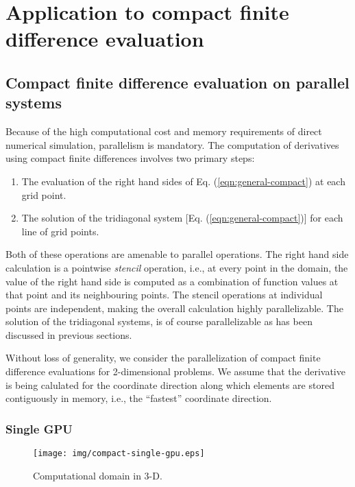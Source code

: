 \chapter{Application to compact finite difference evaluation}

\section{Compact finite difference evaluation on parallel systems}

Because of the high computational cost
and memory requirements of direct numerical simulation,
parallelism is mandatory.
The computation of derivatives using
compact finite differences involves two primary steps:

\begin{enumerate}
\item The evaluation of the right hand sides
    of Eq. (\ref{eqn:general-compact})
    at each grid point.
\item The solution of the tridiagonal system
    [Eq. (\ref{eqn:general-compact})]
    for each line of grid points.
\end{enumerate}

Both of these operations are amenable to parallel operations.
The right hand side calculation is a pointwise
\emph{stencil} operation, i.e.,
at every point in the domain,
the value of the right hand side
is computed as a combination of function values
at that point and its neighbouring points.
The stencil operations at individual points
are independent,
making the overall calculation highly parallelizable.
The solution of the tridiagonal systems,
is of course parallelizable
as has been discussed in previous sections.

Without loss of generality,
we consider the parallelization of
compact finite difference evaluations for 2-dimensional problems.
We assume that the derivative is being calulated
for the coordinate direction along which
elements are stored contiguously in memory, i.e.,
the ``fastest'' coordinate direction.

\subsection{Single GPU}

\begin{figure}
\begin{center}
\texttt{[image: img/compact-single-gpu.eps]}
\caption{Computational domain in 3-D.}
\label{fig:compact-single-gpu}
\end{center}
\end{figure}

